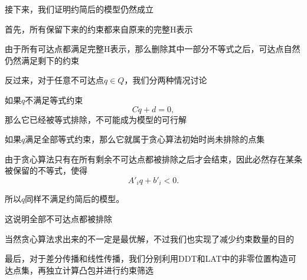 接下来，我们证明约简后的模型仍然成立

首先，所有保留下来的约束都来自原来的完整H表示

由于所有可达点都满足完整H表示，那么删除其中一部分不等式之后，可达点自然仍然满足剩下的约束

反过来，对于任意不可达点$q\in Q$，我们分两种情况讨论

如果$q$不满足等式约束
\[
Cq+d=0,
\]
那么它已经被等式排除，不可能成为模型的可行解

如果$q$满足全部等式约束，那么它就属于贪心算法初始时尚未排除的点集

由于贪心算法只有在所有剩余不可达点都被排除之后才会结束，因此必然存在某条被保留的不等式，使得
\[
A'_iq+b'_i<0.
\]

所以$q$同样不满足约简后的模型。

这说明全部不可达点都被排除

当然贪心算法求出来的不一定是最优解，不过我们也实现了减少约束数量的目的

最后，对于差分传播和线性传播，我们分别利用DDT和LAT中的非零位置构造可达点集，再独立计算凸包并进行约束筛选
